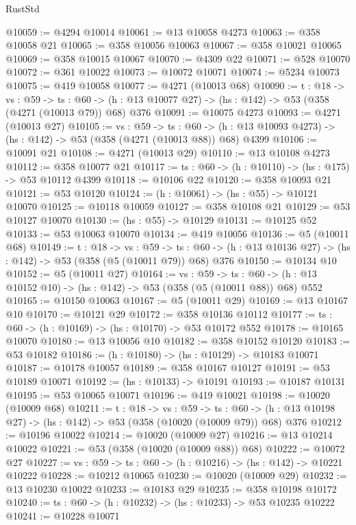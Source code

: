 \begin{lexlean}{RustStd}
\begin{coremodule}
@10059 := @4294 @10014
@10061 := @13 @10058 @4273
@10063 := @358 @10058 @21
@10065 := @358 @10056 @10063
@10067 := @358 @10021 @10065
@10069 := @358 @10015 @10067
@10070 := @4309 @22
@10071 := @528 @10070
@10072 := @361 @10022
@10073 := @10072 @10071
@10074 := @5234 @10073
@10075 := @419 @10058
@10077 := @4271 (@10013 @68)
@10090 := {t : @18} ->
  {vs : @59} ->
  {ts : @60} -> (h : @13 @10077 @27) -> (hs : @142) -> @53 (@358 (@4271 (@10013 @79)) @68) @376
@10091 := @10075 @4273
@10093 := @4271 (@10013 @27)
@10105 := {vs : @59} ->
  {ts : @60} -> (h : @13 @10093 @4273) -> (hs : @142) -> @53 (@358 (@4271 (@10013 @88)) @68) @4399
@10106 := @10091 @21
@10108 := @4271 (@10013 @29)
@10110 := @13 @10108 @4273
@10112 := @358 @10077 @21
@10117 := {ts : @60} -> (h : @10110) -> (hs : @175) -> @53 @10112 @4399
@10118 := @10106 @22
@10120 := @358 @10093 @21
@10121 := @53 @10120
@10124 := (h : @10061) -> (hs : @55) -> @10121 @10070
@10125 := @10118 @10059
@10127 := @358 @10108 @21
@10129 := @53 @10127 @10070
@10130 := (hs : @55) -> @10129
@10131 := @10125 @52
@10133 := @53 @10063 @10070
@10134 := @419 @10056
@10136 := @5 (@10011 @68)
@10149 := {t : @18} ->
  {vs : @59} ->
  {ts : @60} -> (h : @13 @10136 @27) -> (hs : @142) -> @53 (@358 (@5 (@10011 @79)) @68) @376
@10150 := @10134 @10
@10152 := @5 (@10011 @27)
@10164 := {vs : @59} ->
  {ts : @60} -> (h : @13 @10152 @10) -> (hs : @142) -> @53 (@358 (@5 (@10011 @88)) @68) @552
@10165 := @10150 @10063
@10167 := @5 (@10011 @29)
@10169 := @13 @10167 @10
@10170 := @10121 @29
@10172 := @358 @10136 @10112
@10177 := {ts : @60} -> (h : @10169) -> (hs : @10170) -> @53 @10172 @552
@10178 := @10165 @10070
@10180 := @13 @10056 @10
@10182 := @358 @10152 @10120
@10183 := @53 @10182
@10186 := (h : @10180) -> (hs : @10129) -> @10183 @10071
@10187 := @10178 @10057
@10189 := @358 @10167 @10127
@10191 := @53 @10189 @10071
@10192 := (hs : @10133) -> @10191
@10193 := @10187 @10131
@10195 := @53 @10065 @10071
@10196 := @419 @10021
@10198 := @10020 (@10009 @68)
@10211 := {t : @18} ->
  {vs : @59} ->
  {ts : @60} -> (h : @13 @10198 @27) -> (hs : @142) -> @53 (@358 (@10020 (@10009 @79)) @68) @376
@10212 := @10196 @10022
@10214 := @10020 (@10009 @27)
@10216 := @13 @10214 @10022
@10221 := @53 (@358 (@10020 (@10009 @88)) @68)
@10222 := @10072 @27
@10227 := {vs : @59} -> {ts : @60} -> (h : @10216) -> (hs : @142) -> @10221 @10222
@10228 := @10212 @10065
@10230 := @10020 (@10009 @29)
@10232 := @13 @10230 @10022
@10233 := @10183 @29
@10235 := @358 @10198 @10172
@10240 := {ts : @60} -> (h : @10232) -> (hs : @10233) -> @53 @10235 @10222
@10241 := @10228 @10071

\end{coremodule}
\end{lexlean}
